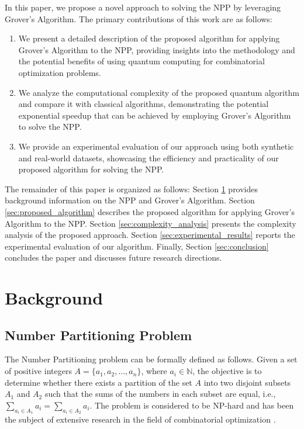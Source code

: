 In this paper, we propose a novel approach to solving the NPP by leveraging Grover's Algorithm. The primary contributions of this work are as follows:

\begin{enumerate}
\item We present a detailed description of the proposed algorithm for applying Grover's Algorithm to the NPP, providing insights into the methodology and the potential benefits of using quantum computing for combinatorial optimization problems.

\item We analyze the computational complexity of the proposed quantum algorithm and compare it with classical algorithms, demonstrating the potential exponential speedup that can be achieved by employing Grover's Algorithm to solve the NPP.

\item We provide an experimental evaluation of our approach using both synthetic and real-world datasets, showcasing the efficiency and practicality of our proposed algorithm for solving the NPP.
\end{enumerate}

The remainder of this paper is organized as follows: Section \ref{sec:background} provides background information on the NPP and Grover's Algorithm. Section \ref{sec:proposed_algorithm} describes the proposed algorithm for applying Grover's Algorithm to the NPP. Section \ref{sec:complexity_analysis} presents the complexity analysis of the proposed approach. Section \ref{sec:experimental_results} reports the experimental evaluation of our algorithm. Finally, Section \ref{sec:conclusion} concludes the paper and discusses future research directions.

\section{Background}
\label{sec:background}

\subsection{Number Partitioning Problem}

The Number Partitioning problem can be formally defined as follows. Given a set of positive integers $A = \{a_1, a_2, \dots, a_n\}$, where $a_i \in \mathbb{N}$, the objective is to determine whether there exists a partition of the set $A$ into two disjoint subsets $A_1$ and $A_2$ such that the sums of the numbers in each subset are equal, i.e., $\sum_{a_i \in A_1} a_i = \sum_{a_i \in A_2} a_i$. The problem is considered to be NP-hard and has been the subject of extensive research in the field of combinatorial optimization \cite{Garey1979}.

